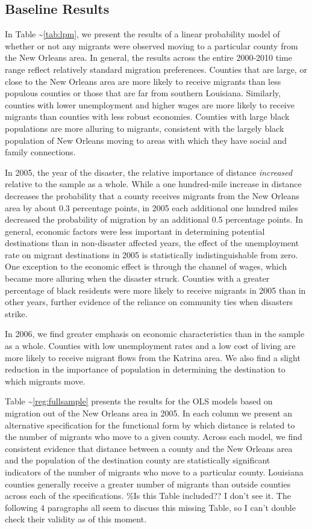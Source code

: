 \documentclass[]{article}
\begin{document}
\subsection{Baseline Results}\label{baseline-results}

In Table \textasciitilde{}\ref{tab:lpm}, we present the results of a
linear probability model of whether or not any migrants were observed
moving to a particular county from the New Orleans area. In general, the
results across the entire 2000-2010 time range reflect relatively
standard migration preferences. Counties that are large, or close to the
New Orleans area are more likely to receive migrants than less populous
counties or those that are far from southern Louisiana. Similarly,
counties with lower unemployment and higher wages are more likely to
receive migrants than counties with less robust economies. Counties with
large black populations are more alluring to migrants, consistent with
the largely black population of New Orleans moving to areas with which
they have social and family connections.

In 2005, the year of the disaster, the relative importance of distance
\emph{increased} relative to the sample as a whole. While a one
hundred-mile increase in distance decreases the probability that a
county receives migrants from the New Orleans area by about 0.3
percentage points, in 2005 each additional one hundred miles decreased
the probability of migration by an additional 0.5 percentage points. In
general, economic factors were less important in determining potential
destinations than in non-disaster affected years, the effect of the
unemployment rate on migrant destinations in 2005 is statistically
indistinguishable from zero. One exception to the economic effect is
through the channel of wages, which became more alluring when the
disaster struck. Counties with a greater percentage of black residents
were more likely to receive migrants in 2005 than in other years,
further evidence of the reliance on community ties when disasters
strike.

In 2006, we find greater emphasis on economic characteristics than in
the sample as a whole. Counties with low unemployment rates and a low
cost of living are more likely to receive migrant flows from the Katrina
area. We also find a slight reduction in the importance of population in
determining the destination to which migrants move.

Table \textasciitilde{}\ref{reg:fullsample} presents the results for the
OLS models based on migration out of the New Orleans area in 2005. In
each column we present an alternative specification for the functional
form by which distance is related to the number of migrants who move to
a given county. Across each model, we find consistent evidence that
distance between a county and the New Orleans area and the population of
the destination county are statistically significant indicators of the
number of migrants who move to a particular county. Louisiana counties
generally receive a greater number of migrants than outside counties
across each of the specifications. \%Is this Table included?? I don't
see it. The following 4 paragraphs all seem to discuss this missing
Table, so I can't double check their validity as of this moment.
\end{document}

